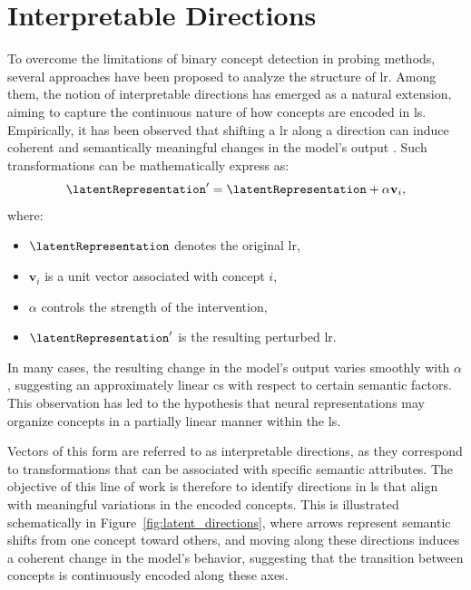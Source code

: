 \section{Interpretable Directions}
\label{sec:direction}

To overcome the limitations of binary concept detection in probing methods, several approaches have been proposed to analyze the structure of \gls{lr}.
Among them, the notion of interpretable directions has emerged as a natural extension, aiming to capture the continuous nature of how concepts are encoded in \gls{ls}.
Empirically, it has been observed that shifting a \gls{lr} along a direction can induce coherent and semantically meaningful changes in the model’s output \cite{haas2024discovering, voynov2020unsuperviseddiscoveryinterpretabledirections}.
Such transformations can be mathematically express as:
\[
\latentRepresentation' = \latentRepresentation + \alpha \mathbf{v}_i,
\]
where:
\begin{itemize}
    \item $\latentRepresentation$ denotes the original \gls{lr},
    \item $\mathbf{v}_i$ is a unit vector associated with concept $i$,
    \item $\alpha$ controls the strength of the intervention,
    \item $\latentRepresentation'$ is the resulting perturbed \gls{lr}.
\end{itemize}

In many cases, the resulting change in the model's output varies smoothly with \(\alpha\), suggesting an approximately linear \gls{cs} with respect to certain semantic factors.
This observation has led to the hypothesis that neural representations may organize concepts in a partially linear manner within the \gls{ls}.

Vectors of this form are referred to as interpretable directions, as they correspond to transformations that can be associated with specific semantic attributes.
The objective of this line of work is therefore to identify directions in \gls{ls} that align with meaningful variations in the encoded concepts.
This is illustrated schematically in Figure~\ref{fig:latent_directions}, where arrows represent semantic shifts from one concept toward others, and moving along these directions induces a coherent change in the model's behavior, suggesting that the transition between concepts is continuously encoded along these axes.



